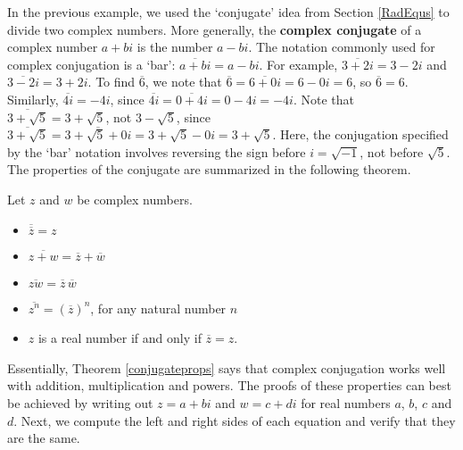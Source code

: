 \documentclass[10pt]{article}
\begin{document}
In the previous example, we used the `conjugate' idea from Section \ref{RadEqus} to divide two complex numbers.  More generally, the \textbf{complex conjugate} of a complex number $a+bi$ is the number $a-bi$.  The notation commonly used for complex conjugation is a `bar':  $\overline{a+bi} = a-bi$. For example, $\overline{3+2i} = 3-2i$ and $\overline{3-2i} = 3+2i$. To find $\overline{6}$, we note that $\overline{6} = \overline{6+0i}= 6 - 0i = 6$, so $\overline{6} = 6$. Similarly, $\overline{4i} = -4i$, since $\overline{4i} = \overline{0 + 4i} = 0 - 4i =  -4i$.  Note that $\overline{3+\sqrt{5}} = 3 + \sqrt{5}$, not $3 - \sqrt{5}$, since  $\overline{3+\sqrt{5}} = \overline{3+\sqrt{5} + 0i} = 3+\sqrt{5}  - 0i = 3+\sqrt{5}$. Here, the conjugation specified by the `bar' notation involves reversing the sign before $i = \sqrt{-1}$, not before  $\sqrt{5}$.  The properties of the conjugate are summarized in the following theorem.

\medskip

\colorbox{ResultColor}{\bbm

\begin{thm}  \label{conjugateprops} Let $z$ and $w$ be complex numbers. 

\begin{itemize}

\item  $\overline{\overline{z}} = z$

\item  $ \overline{z+w} = \overline{z} + \overline{w}$

\item  $ \overline{zw} = \overline{z} \, \overline{w}$

\item  $\overline{z^{n}} = \left(\overline{z}\right)^n$, for any natural number $n$

\item  $z$ is a real number if and only if $\overline{z} = z$.

\end{itemize}

\end{thm}
\ebm}

\medskip

Essentially, Theorem \ref{conjugateprops} says that complex conjugation works well with addition, multiplication and powers.  The proofs of these properties can best be achieved by writing out $z = a+bi$ and $w = c+di$ for real numbers $a$, $b$, $c$ and $d$.   Next, we compute the left and right sides of each equation and verify that they are the same.  
\end{document}
